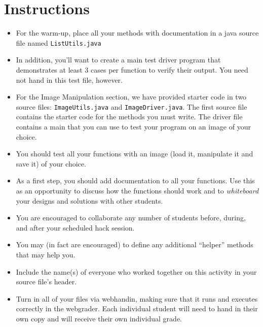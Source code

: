 \documentclass[12pt]{scrartcl}
\begin{document}
\section*{Instructions}

\begin{itemize}

  \item For the warm-up, place all your methods with documentation in a java
  source file named \texttt{ListUtils.java} 
    
  \item In addition, you'll want to create a main test driver program 
  that demonstrates at least 3 cases per function to verify their output.  
  You need not hand in this test file, however.
  
  \item For the Image Manipulation section, we have provided starter code 
  in two source files: \texttt{ImageUtils.java} and 
  \texttt{ImageDriver.java}.  The first source file contains
  the starter code for the methods you must write.  The driver file 
  contains a main that you can use to test your program on an image of
  your choice.
  
  \item You should test all your functions with an image (load it, manipulate
  it and save it) of your choice.
  
  \item As a first step, you should add documentation to all your functions.
  Use this as an opportunity to discuss how the functions should work and
  to \emph{whiteboard} your designs and solutions with other students.
  
  \item You are encouraged to collaborate any number of students 
  before, during, and after your scheduled hack session.  

  \item You may (in fact are encouraged) to define any additional
  ``helper'' methods that may help you.
  
  \item Include the name(s) of everyone who worked together on
  this activity in your source file's header.

  \item Turn in all of your files via webhandin, making sure that 
  it runs and executes correctly in the webgrader.  Each individual 
  student will need to hand in their own copy and will receive 
  their own individual grade.
\end{itemize}  
\end{document}
